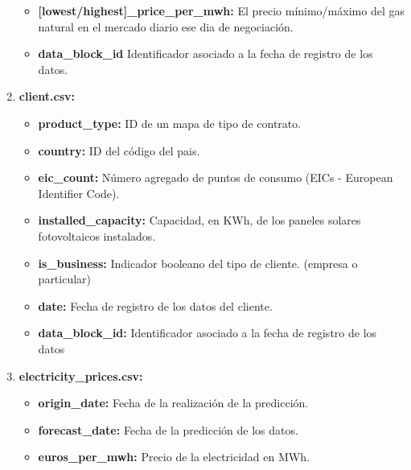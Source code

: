 \documentclass[a4paper,12pt]{article}
\begin{document}
\begin{enumerate}
\begin{itemize}
        \item \textbf{[lowest/highest]\_price\_per\_mwh:}
        El precio mínimo/máximo del gas natural en el 
        mercado diario ese dia de negociación.

        \item \textbf{data\_block\_id}
        Identificador asociado a la fecha de registro de los datos.

    \end{itemize}

    \item \textbf{client.csv:}
    \begin{itemize}
        \item \textbf{product\_type:}
        ID de un mapa de tipo de contrato.

        \item \textbf{country:}
        ID del código del pais.

        \item \textbf{eic\_count:}
        Número agregado de puntos de consumo
        (EICs - European Identifier Code).

        \item \textbf{installed\_capacity:}
        Capacidad, en KWh, de los paneles solares
        fotovoltaicos instalados.

        \item \textbf{is\_business:}
        Indicador booleano del tipo de cliente. (empresa 
        o particular)

        \item \textbf{date:}
        Fecha de registro de los datos del cliente.

        \item \textbf{data\_block\_id:}
        Identificador asociado a la fecha de registro de los datos

    \end{itemize}

    \item \textbf{electricity\_prices.csv:}
    \begin{itemize}
        \item \textbf{origin\_date:}
        Fecha de la realización de la predicción.

        \item \textbf{forecast\_date:}
        Fecha de la predicción de los datos.

        \item \textbf{euros\_per\_mwh:}
        Precio de la electricidad en MWh.


\end{itemize}
\end{enumerate}
\end{document}
